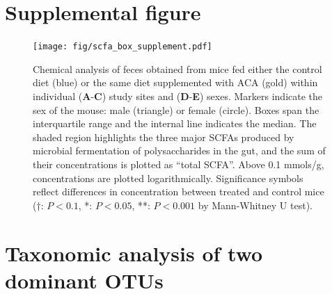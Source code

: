 \documentclass{doc/template/bmcart-nofigbox}
\begin{document}
\section{Supplemental figure}\label{app:supp-figures}

\begin{figure}[h!]
\texttt{[image: fig/scfa\_box\_supplement.pdf]}
  \caption{\label{fig:stratified_metab}
  Chemical analysis of feces obtained from mice fed either the
  control diet (blue)
  or the same diet supplemented with ACA (gold) within individual
  (\textbf{A}-\textbf{C}) study sites and (\textbf{D}-\textbf{E}) sexes.
  Markers indicate the sex of the mouse: male (triangle) or female (circle).
  Boxes span the interquartile range and the internal line indicates the
  median.
  The shaded region highlights the three major SCFAs produced by
  microbial fermentation of polysaccharides in the gut, and the sum of their
  concentrations is plotted as ``total SCFA''.
  Above 0.1 mmols/g, concentrations are plotted logarithmically.
  Significance symbols reflect differences in concentration between treated
  and control mice
  (†: $P < 0.1$, *: $P < 0.05$,
  **: $P < 0.001$ by Mann-Whitney U test).}
\end{figure}

\FloatBarrier

\section{Taxonomic analysis of two dominant OTUs}\label{app:otu_tax}
\end{document}
